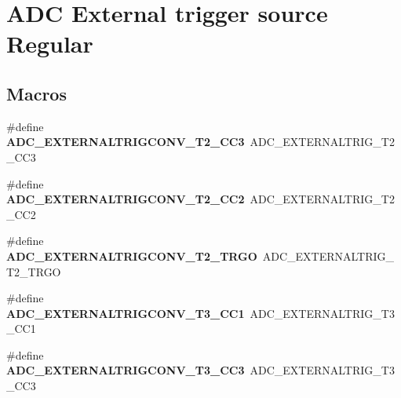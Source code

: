 \hypertarget{group___a_d_c___external__trigger__source___regular}{\section{A\-D\-C External trigger source Regular}
\label{group___a_d_c___external__trigger__source___regular}
}
\subsection*{Macros}
\begin{DoxyCompactItemize}
\item 
\hypertarget{group___a_d_c___external__trigger__source___regular_gabcb1bb78d08450860cd42071ba35a56d}{\#define {\bfseries A\-D\-C\-\_\-\-E\-X\-T\-E\-R\-N\-A\-L\-T\-R\-I\-G\-C\-O\-N\-V\-\_\-\-T2\-\_\-\-C\-C3}~A\-D\-C\-\_\-\-E\-X\-T\-E\-R\-N\-A\-L\-T\-R\-I\-G\-\_\-\-T2\-\_\-\-C\-C3}\label{group___a_d_c___external__trigger__source___regular_gabcb1bb78d08450860cd42071ba35a56d}

\item 
\hypertarget{group___a_d_c___external__trigger__source___regular_ga0b64a9b8ac627c2ca770622c8ada41e6}{\#define {\bfseries A\-D\-C\-\_\-\-E\-X\-T\-E\-R\-N\-A\-L\-T\-R\-I\-G\-C\-O\-N\-V\-\_\-\-T2\-\_\-\-C\-C2}~A\-D\-C\-\_\-\-E\-X\-T\-E\-R\-N\-A\-L\-T\-R\-I\-G\-\_\-\-T2\-\_\-\-C\-C2}\label{group___a_d_c___external__trigger__source___regular_ga0b64a9b8ac627c2ca770622c8ada41e6}

\item 
\hypertarget{group___a_d_c___external__trigger__source___regular_gaa964f17f527400095888ca28c65507c4}{\#define {\bfseries A\-D\-C\-\_\-\-E\-X\-T\-E\-R\-N\-A\-L\-T\-R\-I\-G\-C\-O\-N\-V\-\_\-\-T2\-\_\-\-T\-R\-G\-O}~A\-D\-C\-\_\-\-E\-X\-T\-E\-R\-N\-A\-L\-T\-R\-I\-G\-\_\-\-T2\-\_\-\-T\-R\-G\-O}\label{group___a_d_c___external__trigger__source___regular_gaa964f17f527400095888ca28c65507c4}

\item 
\hypertarget{group___a_d_c___external__trigger__source___regular_ga4f84a7fbf7565ad81837cce418ed5ef1}{\#define {\bfseries A\-D\-C\-\_\-\-E\-X\-T\-E\-R\-N\-A\-L\-T\-R\-I\-G\-C\-O\-N\-V\-\_\-\-T3\-\_\-\-C\-C1}~A\-D\-C\-\_\-\-E\-X\-T\-E\-R\-N\-A\-L\-T\-R\-I\-G\-\_\-\-T3\-\_\-\-C\-C1}\label{group___a_d_c___external__trigger__source___regular_ga4f84a7fbf7565ad81837cce418ed5ef1}

\item 
\hypertarget{group___a_d_c___external__trigger__source___regular_ga9ad7b0c6f5b5e9bcbfa5bf54cac6173d}{\#define {\bfseries A\-D\-C\-\_\-\-E\-X\-T\-E\-R\-N\-A\-L\-T\-R\-I\-G\-C\-O\-N\-V\-\_\-\-T3\-\_\-\-C\-C3}~A\-D\-C\-\_\-\-E\-X\-T\-E\-R\-N\-A\-L\-T\-R\-I\-G\-\_\-\-T3\-\_\-\-C\-C3}\label{group___a_d_c___external__trigger__source___regular_ga9ad7b0c6f5b5e9bcbfa5bf54cac6173d}


\end{DoxyCompactItemize}
